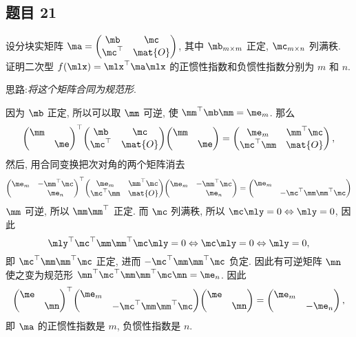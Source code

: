 \subsection*{ 题目 21 }
\begin{problem*}
设分块实矩阵 $\ma = \begin{pmatrix}
    \mb & \mc \\ \mc^\top & \mat{O}
\end{pmatrix}$, 其中 $\mb_{m \times m}$ 正定, $\mc_{m \times n}$ 列满秩. 证明二次型 $f(\mlx) = \quadform{\mlx}{\ma}$ 的正惯性指数和负惯性指数分别为 $m$ 和 $n$.
\end{problem*}
\begin{solution}
思路:\textit{将这个矩阵合同为规范形}.

因为 $\mb$ 正定, 所以可以取 $\mm$ 可逆, 使 $\quadform{\mm}{\mb} = \me_{m}$. 那么
\[
\quadform{
    \begin{pmatrix}
        \mm & \\ & \me
    \end{pmatrix}
}{
    \begin{pmatrix}
        \mb & \mc \\ \mc^\top & \mat{O}
    \end{pmatrix}
} = 
\begin{pmatrix}
    \me_m & \mm^\top \mc \\
    \mc^\top \mm & \mat{O}
\end{pmatrix},
\]
然后, 用合同变换把次对角的两个矩阵消去
\[
\quadform{
    \begin{pmatrix}
        \me_m & -\mm^\top \mc \\
        & \me_n
    \end{pmatrix}
}{
    \begin{pmatrix}
        \me_m & \mm^\top \mc \\
        \mc^\top \mm & \mat{O}
    \end{pmatrix}
} =
\begin{pmatrix}
    \me_m & \\
    & -\mc^\top \mm \mm^\top \mc
\end{pmatrix}
\]
$\mm$ 可逆, 所以 $\mm \mm^\top$ 正定. 而 $\mc$ 列满秩, 所以 $\mc \mly = 0 \Leftrightarrow \mly = 0$, 因此
\[
\quadform{\mly}{\mc^\top \mm \mm^\top \mc} = 0 \Leftrightarrow \mc \mly = 0 \Leftrightarrow \mly = 0,
\]
即 $\mc^\top \mm \mm^\top \mc$ 正定, 进而 $-\mc^\top \mm \mm^\top \mc$ 负定. 因此有可逆矩阵 $\mn$ 使之变为规范形 $\quadform{\mn}{\mc^\top \mm \mm^\top \mc} = \me_n$. 因此
\[
\quadform{
    \begin{pmatrix}
        \me & \\ & \mn
    \end{pmatrix}
}{
    \begin{pmatrix}
        \me_m & \\
        & -\mc^\top \mm \mm^\top \mc
    \end{pmatrix}
} = 
\begin{pmatrix}
    \me_m & \\
    & -\me_n
\end{pmatrix},
\]
即 $\ma$ 的正惯性指数是 $m$, 负惯性指数是 $n$.
\end{solution}